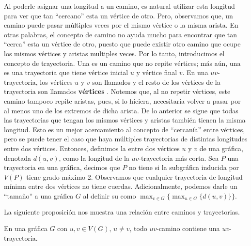 Al poderle asignar una longitud a un camino, es natural utilizar esta longitud
para ver que tan ``cercano'' esta un v\'ertice de otro. Pero, observamos que, un
camino puede pasar m\'ultiples veces por el mismo v\'ertice o la misma arista.
En otras palabras, el concepto de camino no ayuda mucho para encontrar que tan
``cerca'' esta un v\'ertice de otro, puesto que puede existir otro camino que
ocupe los mismos v\'ertices y aristas multiples veces. Por lo tanto,
introducimos el concepto de trayectoria. Una  es un camino
que no repite v\'ertices; m\'as a\'un, una  es una
trayectoria que tiene v\'ertice inicial $u$ y v\'ertice final $v$. En una
$uv$-trayectoria, los v\'ertices $u$ y $v$ son llamados
 y el resto de los v\'ertices de la trayectoria
son llamados \textbf{v\'ertices} . Notemos que,
al no repetir v\'ertices, este camino tampoco repite aristas, pues, si lo
hiciera, necesitar\'ia volver a pasar por al menos uno de los extremos de dicha
arista. De lo anterior se sigue que todas las trayectorias que tengan los mismos
v\'ertices y aristas tambi\'en tienen la misma longitud. Esto es un mejor
acercamiento al concepto de ``cercan\'ia'' entre v\'ertices, pero se puede tener
el caso que haya m\'ultiples trayectorias de distintas longitudes entre dos
v\'ertices. Entonces, definimos la  entre dos v\'ertices $u$ y
$v$ de una gr\'afica, denotada $d(u,v)$, como la longitud de la $uv$-trayectoria
m\'as corta. Sea $P$ una trayectoria en una gr\'afica, decimos que $P$ no tiene
 si la subgr\'afica inducida por $V(P)$ tiene grado m\'aximo 2.
Observamos que cualquier trayectoria de longitud m\'inima entre dos v\'ertices
no tiene cuerdas. Adicionalmente, podemos darle un ``tama\~{n}o'' a una
gr\'afica $G$ al definir su  como $\max_{v\in G}\{\max_{u\in
G}\{d(u,v)\}\}$. 

La siguiente proposici\'on nos muestra una relaci\'on entre caminos y
trayectorias.  

\begin{proposicion}
\label{prop:CamTray}
    En una gr\'afica $G$ con $u, v \in V(G)$, $u \ne v$, todo $uv$-camino
    contiene una $uv$-trayectoria.
\end{proposicion}

